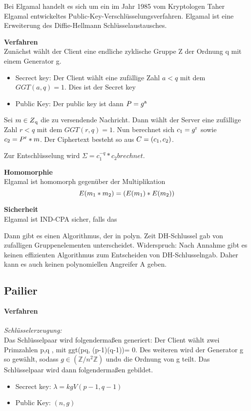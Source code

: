 Bei Elgamal handelt es sich um ein im Jahr 1985 vom Kryptologen Taher Elgamal entwickeltes Public-Key-Verschlüsselungsverfahren. Elgamal ist eine Erweiterung des Diffie-Hellmann
Schlüsselaustausches.

\textbf{Verfahren}\\

Zunächst wählt der Client eine endliche zyklische Gruppe Z der Ordnung q mit einem Generator g.
\begin{itemize}	
	\item Secrect key: Der Client wählt eine zufällige Zahl $a<q$ mit dem $GGT(a,q) = 1$. Dies ist der Secret key
	\item Public Key: Der public key ist dann $P = g\textsuperscript{a} $	
\end{itemize}

Sei $m \in Z\textsubscript{q}$ die zu versendende Nachricht. Dann wählt der Server eine zufällige Zahl $r<q$ mit dem $GGT(r,q) = 1$. Nun berechnet sich $c\textsubscript{1} = g\textsuperscript{r}$ sowie $c\textsubscript{2} =P \textsuperscript{r} *m$. Der Ciphertext besteht so aus $C = (c\textsubscript{1},c\textsubscript{2})$.

Zur Entschlüsselung wird $\Sigma = c_{1}^{-q} * c_{2} brechnet.$

\textbf{Homomorphie}\\
Elgamal ist homomorph gegenüber der Multiplikation
$$ E(m \textsubscript{1} * m \textsubscript{2}) = (E(m \textsubscript{1}) * E(m \textsubscript{2}))$$

\textbf{Sicherheit}\\
Elgamal ist IND-CPA sicher, falls das



Dann gibt es einen Algorithmus, der in polyn. Zeit DH-Schlussel gab von zufalligen Gruppenelementen unterscheidet.
Widerspruch:
Nach Annahme gibt es keinen effizienten
Algorithmus zum Entscheiden von DH-Schlusselngab.
Daher kann es auch keinen polynomiellen Angreifer A geben.



\subsection{Pailier}
\label{sec:Sec1.3.2}

\textbf{Verfahren}\\
\\
\textit{Schlüsselerzeugung:}\\
Das Schlüsselpaar wird folgendermaßen generiert:
Der Client wählt zwei Primzahlen p,q , mit ggt(pq, (p-1)(q-1))= 0. Des weiteren wird der Generator g so gewählt, sodass $ g \in (\mathbb{Z}/ n^{2} \mathbb{Z}) $ und$ n $ die Ordnung von g teilt.
Das Schlüsselpaar wird dann folgendermaßen gebildet.
\begin{itemize}	
	\item Secrect key: $ \lambda = kgV(p-1, q-1) $
	\item Public Key: $(n,g)$	
\end{itemize}

